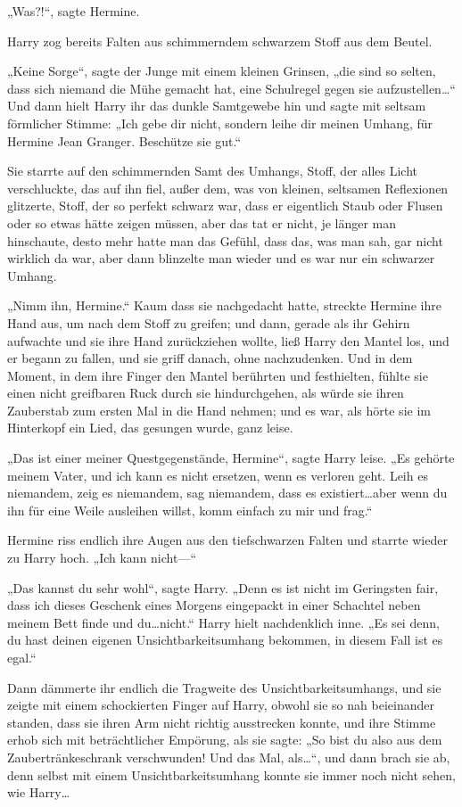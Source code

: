 {„Was?!“, sagte Hermine.

Harry zog bereits Falten aus schimmerndem schwarzem Stoff aus dem Beutel.

„Keine Sorge“, sagte der Junge mit einem kleinen Grinsen, „die sind so selten, dass sich niemand die Mühe gemacht hat, eine Schulregel gegen sie aufzustellen…“ Und dann hielt Harry ihr das dunkle Samtgewebe hin und sagte mit seltsam förmlicher Stimme: „Ich gebe dir nicht, sondern leihe dir meinen Umhang, für Hermine Jean Granger. Beschütze sie gut.“

Sie starrte auf den schimmernden Samt des Umhangs, Stoff, der alles Licht verschluckte, das auf ihn fiel, außer dem, was von kleinen, seltsamen Reflexionen glitzerte, Stoff, der so perfekt schwarz war, dass er eigentlich Staub oder Flusen oder so etwas hätte zeigen müssen, aber das tat er nicht, je länger man hinschaute, desto mehr hatte man das Gefühl, dass das, was man sah, gar nicht wirklich da war, aber dann blinzelte man wieder und es war nur ein schwarzer Umhang.

„Nimm ihn, Hermine.“ Kaum dass sie nachgedacht hatte, streckte Hermine ihre Hand aus, um nach dem Stoff zu greifen; und dann, gerade als ihr Gehirn aufwachte und sie ihre Hand zurückziehen wollte, ließ Harry den Mantel los, und er begann zu fallen, und sie griff danach, ohne nachzudenken. Und in dem Moment, in dem ihre Finger den Mantel berührten und festhielten, fühlte sie einen nicht greifbaren Ruck durch sie hindurchgehen, als würde sie ihren Zauberstab zum ersten Mal in die Hand nehmen; und es war, als hörte sie im Hinterkopf ein Lied, das gesungen wurde, ganz leise.

„Das ist einer meiner Questgegenstände, Hermine“, sagte Harry leise. „Es gehörte meinem Vater, und ich kann es nicht ersetzen, wenn es verloren geht. Leih es niemandem, zeig es niemandem, sag niemandem, dass es existiert…aber wenn du ihn für eine Weile ausleihen willst, komm einfach zu mir und frag.“

Hermine riss endlich ihre Augen aus den tiefschwarzen Falten und starrte wieder zu Harry hoch. „Ich kann nicht—“

„Das kannst du sehr wohl“, sagte Harry. „Denn es ist nicht im Geringsten fair, dass ich dieses Geschenk eines Morgens eingepackt in einer Schachtel neben meinem Bett finde und du…nicht.“ Harry hielt nachdenklich inne. „Es sei denn, du hast deinen eigenen Unsichtbarkeitsumhang bekommen, in diesem Fall ist es egal.“

Dann dämmerte ihr endlich die Tragweite des Unsichtbarkeitsumhangs, und sie zeigte mit einem schockierten Finger auf Harry, obwohl sie so nah beieinander standen, dass sie ihren Arm nicht richtig ausstrecken konnte, und ihre Stimme erhob sich mit beträchtlicher Empörung, als sie sagte: „So bist du also aus dem Zaubertränkeschrank verschwunden! Und das Mal, als…“, und dann brach sie ab, denn selbst mit einem Unsichtbarkeitsumhang konnte sie immer noch nicht sehen, wie Harry…

}
